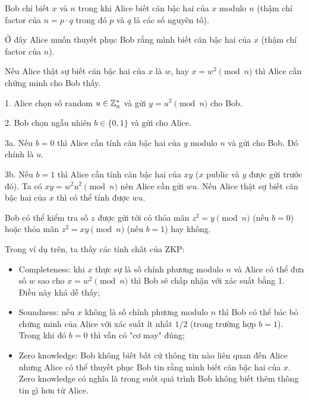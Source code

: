 Bob chỉ biết $x$ và $n$ trong khi Alice biết căn bậc hai của $x$ modulo $n$ (thậm chí factor của $n = p \cdot q$ trong đó $p$ và $q$ là các số nguyên tố).

Ở đây Alice muốn thuyết phục Bob rằng mình biết căn bậc hai của $x$ (thậm chí factor của $n$).

Nếu Alice thật sự biết căn bậc hai của $x$ là $w$, hay $x = w^2 \pmod n$ thì Alice cần chứng minh cho Bob thấy.

1. Alice chọn số random $u \in \mathbb{Z}_n^*$ và gửi $y = u^2 \pmod n$ cho Bob.

2. Bob chọn ngẫu nhiên $b \in \{ 0, 1 \}$ và gửi cho Alice.

3a. Nếu $b = 0$ thì Alice cần tính căn bậc hai của $y$ modulo $n$ và gửi cho Bob. Đó chính là $u$.

3b. Nếu $b = 1$ thì Alice cần tính căn bậc hai của $xy$ ($x$ public và $y$ được gửi trước đó). Ta có $xy = w^2 u^2 \pmod n$ nên Alice cần gửi $wu$. Nếu Alice thật sự biết căn bậc hai của $x$ thì có thể tính được $wu$.

Bob có thể kiểm tra số $z$ được gửi tới có thỏa mãn $z^2 = y \pmod n$ (nếu $b = 0$) hoặc thỏa mãn $z^2 = xy \pmod n$ (nếu $b = 1$) hay không.

Trong ví dụ trên, ta thấy các tính chất của ZKP:

\begin{itemize}
    \item Completeness: khi $x$ thực sự là số chính phương modulo $n$ và Alice có thể đưa số $w$ sao cho $x = w^2 \pmod n$ thì Bob sẽ chấp nhận với xác suất bằng 1. Điều này khá dễ thấy;
    \item Soundness: nếu $x$ không là số chính phương modulo $n$ thì Bob có thể bác bỏ chứng minh của Alice với xác suất ít nhất $1/2$ (trong trường hợp $b=1$). Trong khi đó $b=0$ thì vẫn có "cơ may" đúng;
    \item Zero knowledge: Bob không biết bất cứ thông tin nào liên quan đến Alice nhưng Alice có thể thuyết phục Bob tin rằng mình biết căn bậc hai của $x$. Zero knowledge có nghĩa là trong suốt quá trình Bob không biết thêm thông tin gì hơn từ Alice.
\end{itemize}

